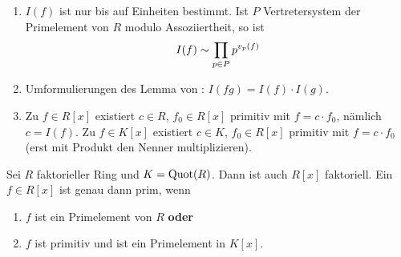\begin{remark}
	\begin{enumerate} %
		\item $I(f)$ ist nur bis auf Einheiten bestimmt. Ist $P$ Vertretersystem der Primelement von $R$ modulo Assoziiertheit, so ist
		\begin{align}
			I(f) \sim \prod_{p \in P} p^{v_p(f)}\notag
		\end{align}
		\item Umformulierungen des Lemma von : $I(fg) = I(f)\cdot I(g)$.
		\item Zu $f \in R[x]$ existiert $c \in R$, $f_0 \in R[x]$ primitiv mit $f = c\cdot f_0$, nämlich $c = I(f)$. Zu $f \in K[x]$ existiert $c \in K$, $f_0 \in R[x]$ primitiv mit $f = c \cdot f_0$ (erst mit Produkt den Nenner multiplizieren).
	\end{enumerate}
\end{remark}

\begin{theorem}
	Sei $R$ faktorieller Ring und $K = \operatorname{Quot}(R)$. Dann ist auch $R[x]$ faktoriell. Ein $f \in R[x]$ ist genau dann prim, wenn
	\begin{enumerate}
	\item $f$ ist ein Primelement von $R$ \textbf{oder}
	\item $f$ ist primitiv und ist ein Primelement in $K[x]$.
	\end{enumerate}
\end{theorem}

